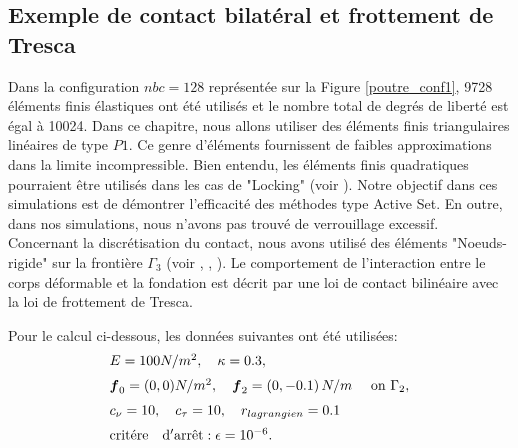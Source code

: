 \subsection{Exemple de contact bilatéral et frottement de Tresca}
Dans la configuration $ nbc = 128 $ représentée sur la Figure \ref{poutre_conf1}, 9728 éléments finis élastiques ont été utilisés et le nombre total de degrés de liberté est égal à 10024. Dans ce chapitre, nous allons utiliser des éléments finis triangulaires linéaires de type $P1$. Ce genre d'éléments fournissent de faibles approximations dans la limite incompressible. Bien entendu, les éléments finis quadratiques pourraient être utilisés dans les cas de "Locking" (voir \cite{belgacem2005mixed}). Notre objectif dans ces simulations est de démontrer l'efficacité des méthodes type Active Set. En outre, dans nos simulations, nous n'avons pas trouvé de verrouillage excessif. Concernant la discrétisation du contact, nous avons utilisé des éléments "Noeuds-rigide" sur la frontière $\Gamma_3$ (voir \cite{alart1991mixed}, \cite{laursen2013computational}, \cite{wriggers2004computational}). Le comportement de l'interaction entre le corps déformable et la fondation est décrit par une loi de contact bilinéaire avec la loi de frottement de Tresca.

Pour le calcul ci-dessous, les données suivantes ont été utilisées:
\begin{eqnarray*}
	\begin{array}{l}
		E= 100 N/m^2,\quad \kappa=0.3,\nonumber \\[2mm]
		\mbox{\boldmath{$f$}}_0=(0, 0) N/m^2, \quad \mbox{\boldmath{$f$}}_2= (0, -0.1)\, N/m    \quad \mbox{ on }
		\Gamma_2, \nonumber\\[2mm]
		c_\nu=10, \quad c_\tau=10,\quad r_{ lagrangien}=0.1\nonumber\\[2mm]
		{\rm crit\acute{e}re \quad d'arr\hat{e}t}: \epsilon=10^{-6}.
	\end{array}
\end{eqnarray*}

